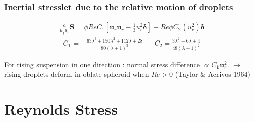 \documentclass{sintefbeamer}
\begin{document}
\begin{frame}
  \frametitle{Inertial stresslet due to the relative motion of droplets}


  \begin{align*}
    \frac{a}{\mu_f u_r} \bm S
     =
    \phi Re C_1
    [
      \textbf{u}_r\textbf{u}_r - \frac{1}{3}u_r ^2\bm\delta 
      ]
      + Re \phi C_2 (u_r ^2) \bm\delta
  \end{align*} 
\begin{align*}
    C_1  =  -\frac{63 \lambda^{3} + 150 \lambda^{2} + 112 \lambda + 28}{80 \left(\lambda + 1\right)^{3}}
    &&
    C_2  = \frac{3\lambda^2 + 6\lambda + 4}{48(\lambda +1 )^2}
  \end{align*}
  
For rising suspension in one direction : normal stress difference $\propto C_1 \bm u_r^2$.
$\to$ rising droplets deform in oblate spheroid when $Re > 0$ (Taylor \& Acrivos 1964)%


\end{frame}




\section{Reynolds Stress}
\end{document}
